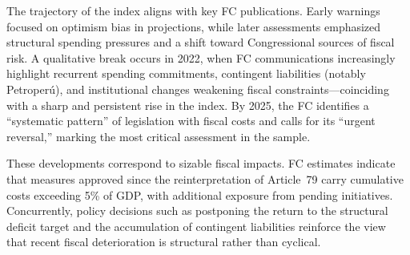 \documentclass[a4paper, fleqn, 12pt]{article}
\begin{document}
The trajectory of the index aligns with key FC publications. Early warnings focused on optimism bias in projections, while later assessments emphasized structural spending pressures and a shift toward Congressional sources of fiscal risk. A qualitative break occurs in 2022, when FC communications increasingly highlight recurrent spending commitments, contingent liabilities (notably Petroper\'{u}), and institutional changes weakening fiscal constraints---coinciding with a sharp and persistent rise in the index. By 2025, the FC identifies a ``systematic pattern'' of legislation with fiscal costs and calls for its ``urgent reversal,'' marking the most critical assessment in the sample.

These developments correspond to sizable fiscal impacts. FC estimates indicate that measures approved since the reinterpretation of Article~79 carry cumulative costs exceeding 5\% of GDP, with additional exposure from pending initiatives. Concurrently, policy decisions such as postponing the return to the structural deficit target and the accumulation of contingent liabilities reinforce the view that recent fiscal deterioration is structural rather than cyclical.

\end{document}
